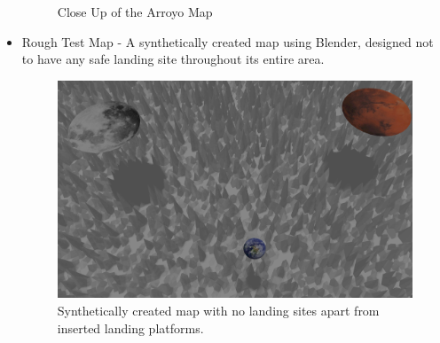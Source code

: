 \begin{itemize}
\begin{figure}
        \caption{Close Up of the Arroyo Map}
    \end{figure}
    \item Rough Test Map - A synthetically created map using Blender, designed not to have any safe landing site throughout its entire area. 
    \begin{figure}
        \centering
        \includegraphics[scale=0.285]{images/evaluation/rough_test_map.png}
        \caption{Synthetically created map with no landing sites apart from inserted landing platforms.}
    \end{figure}
\end{itemize}
